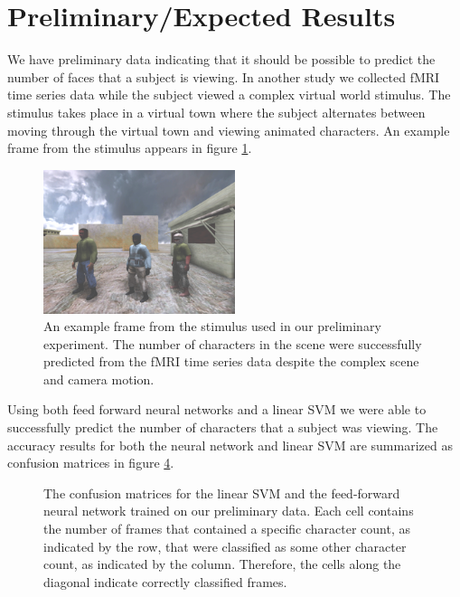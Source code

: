 \documentclass[12pt]{article}
\begin{document}
\section{Preliminary/Expected Results}
We have preliminary data indicating that it should be possible to predict the number of faces that a subject is viewing.
In another study we collected fMRI time series data while the subject viewed a complex virtual world stimulus.
The stimulus takes place in a virtual town where the subject alternates between moving through the virtual town and viewing animated characters.
An example frame from the stimulus appears in figure \ref{fig:preliminary-data-frame}.
\begin{figure}
\centering
\includegraphics[width=0.5\textwidth]{figures/preliminary-data-frame}
\caption{An example frame from the stimulus used in our preliminary experiment.
The number of characters in the scene were successfully predicted from the fMRI time series data despite the complex scene and camera motion.}
\label{fig:preliminary-data-frame}
\end{figure}
Using both feed forward neural networks and a linear SVM we were able to successfully predict the number of characters that a subject was viewing.
The accuracy results for both the neural network and linear SVM are summarized as confusion matrices in figure \ref{fig:preliminary-data-confusion}.
\begin{figure}
\centering
\begin{subfigure}{\textwidth}
\centering

\caption{}
\label{fig:svm-confusion}
\end{subfigure}
\begin{subfigure}{\textwidth}
\centering

\caption{}
\label{fig:nn-confusion}
\end{subfigure}
\caption{The confusion matrices for the  linear SVM and the  feed-forward neural network trained on our preliminary data.
Each cell contains the number of frames that contained a specific character count, as indicated by the row, that were classified as some other character count, as indicated by the column.
Therefore, the cells along the diagonal indicate correctly classified frames.}
\label{fig:preliminary-data-confusion}
\end{figure}
\end{document}
